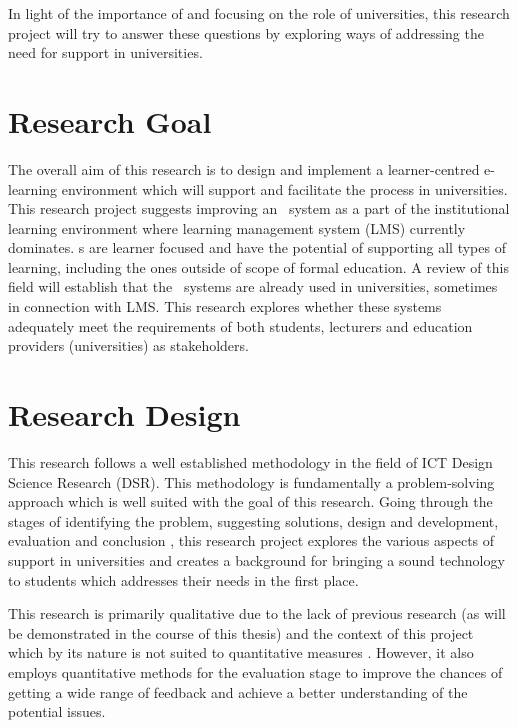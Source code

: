 In light of the importance of \LLLs and focusing on the role of universities,
this research project will try to answer these questions by exploring ways
of addressing the need for \LLLs support in universities.

\section{Research Goal}

The overall aim of this research is to design and implement a learner-centred
e-learning environment which will support and facilitate the \LLLs process in
universities. This research project suggests improving an \ep~system as a part
of the institutional learning environment where learning management system (LMS)
currently dominates. \ep s are learner focused and have the potential of
supporting all types of learning, including the ones outside of scope of formal
education. A review of this field will establish that the \ep~systems are
already used in universities, sometimes in connection with LMS. This research
explores whether these systems adequately meet the requirements of both
students, lecturers and education providers (universities) as \LLLs
stakeholders.

\section{Research Design}

This research follows a well established methodology in the field of ICT Design
Science Research (DSR). This methodology is fundamentally a problem-solving
approach \citep{Cross1993} which is well suited with the goal of this research.
Going through the stages of identifying the problem, suggesting solutions,
design and development, evaluation and conclusion
\citep{Peffers2008,Vaishnavi2007}, this research project explores the various
aspects of \LLLs support in universities and creates a background for bringing a
sound technology to students which addresses their needs in the first place.

This research is primarily qualitative due to the lack of previous research (as
will be demonstrated in the course of this thesis) and the \LLLs context of this
project which by its nature is not suited to quantitative measures
\citep{Creswell2009}. However, it also employs quantitative methods for the 
evaluation stage to improve the chances of getting a wide range of feedback and
achieve a better understanding of the potential issues.


